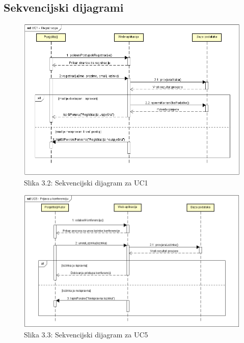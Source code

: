 			\subsection{Sekvencijski dijagrami}
				
		\begin{figure}[H]
			\includegraphics[scale=0.7]{slike/UC1.PNG} 
			\centering
			\caption{Slika 3.2: Sekvencijski dijagram za UC1}
			\label{fig:UC1}
		\end{figure}	

		\begin{figure}[H]
			\includegraphics[scale=0.7]{slike/UC5.PNG} 
			\centering
			\caption{Slika 3.3: Sekvencijski dijagram za UC5}
			\label{fig:UC5}
		\end{figure}

